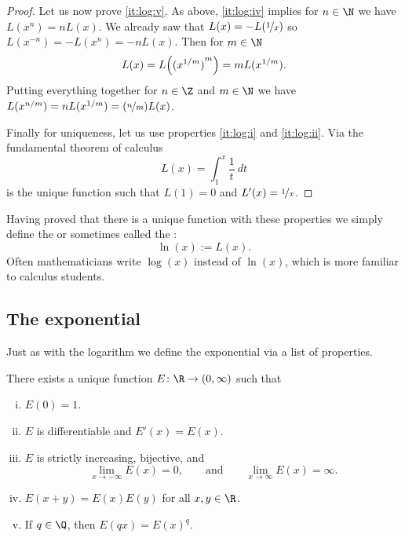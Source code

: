 \documentclass[12pt]{book}
\begin{document}
\begin{proof}
Let us now prove \ref{it:log:v}.
As above, \ref{it:log:iv} implies for $n \in \N$ we have
$L(x^n) = n L(x)$.
We already saw that
$L(x) = - L(\nicefrac{1}{x})$
so $L(x^{-n}) = - L(x^n) = -n L(x)$.
Then for $m \in \N$
\begin{equation*}
L(x) = L\Bigl({(x^{1/m})}^m\Bigr) = m L(x^{1/m}) .
\end{equation*}
Putting everything together for $n \in \Z$ and $m \in \N$ we have
$L(x^{n/m}) = n L(x^{1/m}) = (\nicefrac{n}{m}) L(x)$.

Finally for uniqueness, let us use properties \ref{it:log:i} and
\ref{it:log:ii}.
Via the fundamental theorem of calculus
\begin{equation*}
L(x) = \int_1^x \frac{1}{t}~dt
\end{equation*}
is the unique function such that $L(1) = 0$ and $L'(x) = \nicefrac{1}{x}$.
\end{proof}

Having proved
that there is a unique function with these properties
we simply define the \emph{} or sometimes called the
\emph{}:
\begin{equation*}
\ln(x) := L(x) .
\end{equation*}
Often mathematicians write $\log(x)$ instead of $\ln(x)$, which is
more familiar to calculus students.

\subsection*{The exponential}

Just as with the logarithm we define the exponential via a list of
properties.

\begin{prop}
There exists a unique function $E \colon \R \to (0,\infty)$ such that
\begin{enumerate}[(i)]
\item \label{it:exp:i}
$E(0) = 1$.
\item \label{it:exp:ii}
$E$ is differentiable and $E'(x) = E(x)$.
\item \label{it:exp:iii}
$E$ is strictly increasing, bijective, and
\begin{equation*}
\lim_{x\to -\infty} E(x) = 0 , \qquad \text{and} \qquad
\lim_{x\to \infty} E(x) = \infty .
\end{equation*}
\item \label{it:exp:iv}
$E(x+y) = E(x)E(y)$ for all $x,y \in \R$.
\item \label{it:exp:v}
If $q \in \Q$, then
$E(qx) = {E(x)}^q$.
\end{enumerate}
\end{prop}
\end{document}
